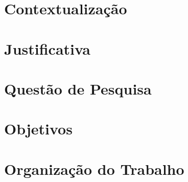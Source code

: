 


\section{Contextualização}


\section{Justificativa}


\section{Questão de Pesquisa}


\section{Objetivos}


% 

\section{Organização do Trabalho}
